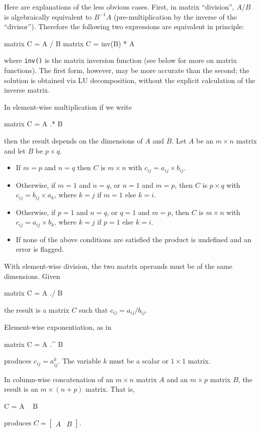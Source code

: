 Here are explanations of the less obvious cases.  First, in matrix
``division'', $A/B$ is algebraically equivalent to $B^{-1}A$
(pre-multiplication by the inverse of the ``divisor'').  Therefore the
following two expressions are equivalent in principle:
%
\begin{code}
matrix C = A / B
matrix C = inv(B) * A
\end{code}
%
where \texttt{inv()} is the matrix inversion function (see below for
more on matrix functions).  The first form, however, may be more
accurate than the second; the solution is obtained via LU
decomposition, without the explicit calculation of the inverse matrix.

In element-wise multiplication if we write
%
\begin{code}
matrix C = A .* B
\end{code}
% 
then the result depends on the dimensions of $A$ and $B$.  Let $A$ be
an $m \times n$ matrix and let $B$ be $p \times q$.  
%
\begin{itemize}
\item If $m=p$ and $n=q$ then $C$ is $m\times n$ with $c_{ij} = a_{ij}
  \times b_{ij}$.
\item Otherwise, if $m=1$ and $n=q$, or $n=1$ and $m=p$, then $C$ is
  $p\times q$ with $c_{ij} = b_{ij} \times a_k$, where $k=j$ if $m=1$
  else $k=i$.
\item Otherwise, if $p=1$ and $n=q$, or $q=1$ and $m=p$, then $C$ is
  $m\times n$ with $c_{ij} = a_{ij} \times b_k$, where $k=j$ if $p=1$
  else $k=i$.
\item If none of the above conditions are satisfied the product is
  undefined and an error is flagged.
\end{itemize}

With element-wise division, the two matrix operands must be of the
same dimensions.  Given
%
\begin{code}
matrix C = A ./ B
\end{code}
% 
the result is a matrix $C$ such that $c_{ij} = a_{ij}/b_{ij}$.

Element-wise exponentiation, as in 
%
\begin{code}
matrix C = A .^ B
\end{code}
% 
produces $c_{ij} = a_{ij}^k$.  The variable $k$ must be a scalar or
$1\times 1$ matrix.

In column-wise concatenation of an $m\times n$ matrix $A$ and
an $m\times p$ matrix $B$, the result is an $m\times (n+p)$ matrix.
That is,
%
\begin{code}
C = A ~ B
\end{code}
% 
produces $C = \left[ \begin{array}{cc} A & B \end{array} \right]$.

